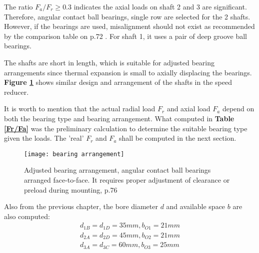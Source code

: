 The ratio $ F_a/F_r \geq 0.3 $ indicates the axial loads on shaft 2 and 3 are significant. Therefore, angular contact ball bearings, single row are selected for the 2 shafts. However, if the bearings are used, misalignment should not exist as recommended by the comparison table on p.72 \cite{rolling_bearings}. For shaft 1, it uses a pair of deep groove ball bearings.

The shafts are short in length, which is suitable for adjusted bearing arrangements since thermal expansion is small to axially displacing the bearings. \textbf{Figure \ref{bearing arrangement}} shows similar design and arrangement of the shafts in the speed reducer.

It is worth to mention that the actual radial load $ F_r $ and axial load $ F_a $ depend on both the bearing type and bearing arrangement. What computed in \textbf{Table \ref{Fr/Fa}} was the preliminary calculation to determine the suitable bearing type given the loads. The 'real' $ F_r $ and $ F_a $ shall be computed in the next section.

\begin{figure}[ht]
	\centering
	\texttt{[image: bearing arrangement]}
	\caption{Adjusted bearing arrangement, angular contact ball bearings arranged face-to-face. It requires proper adjustment of clearance or preload during mounting, p.76 \cite{rolling_bearings}}
	\label{bearing arrangement}
\end{figure}

Also from the previous chapter, the bore diameter $ d $ and available space $ b $ are also computed:
\[
\begin{array}{l}
d_{1B} = d_{1D} = 35 \unit{mm}, b_{O1} = 21 \unit{mm}\\
d_{2A} = d_{2D} = 45 \unit{mm}, b_{O2} = 21 \unit{mm}\\
d_{3A} = d_{3C} = 60 \unit{mm}, b_{O3} = 25 \unit{mm}\\
\end{array}
\]

